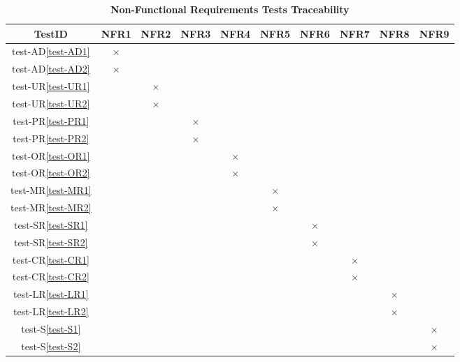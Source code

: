 \documentclass[12pt, titlepage]{article}
\begin{document}
\begin{landscape}
\begin{table} [H]
  \centering
  \begin{tabular}{|c|c|c|c|c|c|c|c|c|c|}
    \hline
    TestID & NFR1 & NFR2 & NFR3 & NFR4 & NFR5 & NFR6 & NFR7 & NFR8 & NFR9 \\
    \hline
    test-AD\ref{test-AD1} & $\times$ & & & & & & & & \\
    \hline
    test-AD\ref{test-AD2} &  $\times$ & & & & & & & & \\
    \hline
    test-UR\ref{test-UR1} & & $\times$ &  & & & & & & \\
    \hline
    test-UR\ref{test-UR2} & & $\times$ & & & & & & &  \\
    \hline
    test-PR\ref{test-PR1} & & & $\times$ & & & & & & \\
    \hline
    test-PR\ref{test-PR2} & & & $\times$ & & & & & & \\
    \hline
    test-OR\ref{test-OR1} & & & & $\times$ & & & & &  \\
    \hline
    test-OR\ref{test-OR2} & & & & $\times$ & & & & & \\
    \hline
    test-MR\ref{test-MR1} & & & & & $\times$ & & & &\\
    \hline
    test-MR\ref{test-MR2} & & & & & $\times$ & & & &  \\
    \hline
    test-SR\ref{test-SR1} & & & & & & $\times$ & & &\\
    \hline
    test-SR\ref{test-SR2} & & & & & & $\times$ & & & \\
    \hline
    test-CR\ref{test-CR1} & & & & & & & $\times$ & &\\
    \hline
    test-CR\ref{test-CR2} & & & & & & & $\times$ & & \\
    \hline
    test-LR\ref{test-LR1} & & & & & & & & $\times$ &\\
    \hline
    test-LR\ref{test-LR2} & & & & & & & & $\times$ & \\
    \hline
    test-S\ref{test-S1} & & & & & & & & & $\times$ \\
    \hline
    test-S\ref{test-S2} & & & & & & & & & $\times$\\
    \hline
  \end{tabular}
\caption{\bf Non-Functional Requirements Tests Traceability} \label{tab:nfr-test-traceability}
\end{table}



\end{landscape}
\end{document}
